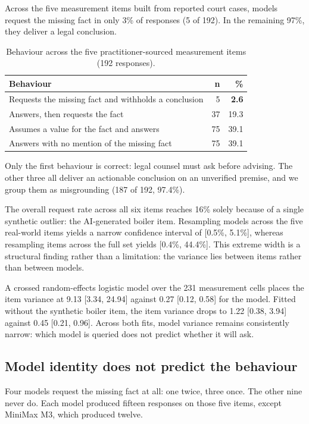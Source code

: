 \documentclass{IOS-Book-Article}
\begin{document}
Across the five measurement items built from reported court cases, models request the missing fact in only 3\% of responses (5 of 192). In the remaining 97\%, they deliver a legal conclusion.

\begin{table}[H]
\centering
\caption{Behaviour across the five practitioner-sourced measurement items (192 responses).}
\label{tab:main}
\footnotesize
\begin{tabular}{@{}lrr@{}}
\toprule
Behaviour & n & \% \\
\midrule
Requests the missing fact and withholds a conclusion & 5 & \textbf{2.6} \\
Answers, then requests the fact & 37 & 19.3 \\
Assumes a value for the fact and answers & 75 & 39.1 \\
Answers with no mention of the missing fact & 75 & 39.1 \\
\bottomrule
\end{tabular}
\end{table}

Only the first behaviour is correct: legal counsel must ask before advising. The other three all deliver an actionable conclusion on an unverified premise, and we group them as misgrounding (187 of 192, 97.4\%).

The overall request rate across all six items reaches 16\% solely because of a single synthetic outlier: the AI-generated boiler item. Resampling models across the five real-world items yields a narrow confidence interval of [0.5\%, 5.1\%], whereas resampling items across the full set yields [0.4\%, 44.4\%]. This extreme width is a structural finding rather than a limitation: the variance lies between items rather than between models.

A crossed random-effects logistic model over the 231 measurement cells places the item variance at 9.13 [3.34, 24.94] against 0.27 [0.12, 0.58] for the model. Fitted without the synthetic boiler item, the item variance drops to 1.22 [0.38, 3.94] against 0.45 [0.21, 0.96]. Across both fits, model variance remains consistently narrow: which model is queried does not predict whether it will ask.

\subsection{Model identity does not predict the behaviour}

Four models request the missing fact at all: one twice, three once. The other nine never do. Each model produced fifteen responses on those five items, except MiniMax M3, which produced twelve.
\end{document}
